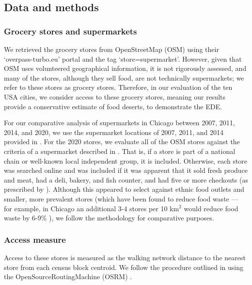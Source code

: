 \documentclass[final,3p,times,onecolumn,sort&compress]{elsarticle}
\begin{document}
\subsection{Data and methods}
\subsubsection{Grocery stores and supermarkets}
We retrieved the grocery stores from OpenStreetMap (OSM) using their `overpass-turbo.eu' portal and the tag `store=supermarket'.
However, given that OSM uses volunteered geographical information, it is not rigorously assessed, and many of the stores, although they sell food, are not technically supermarkets; we refer to these stores as grocery stores.
Therefore, in our evaluation of the ten USA cities, we consider access to these grocery stores, meaning our results provide a conservative estimate of food deserts, to demonstrate the EDE.

For our comparative analysis of supermarkets in Chicago between 2007, 2011, 2014, and 2020, we use the supermarket locations of 2007, 2011, and 2014 provided in \cite{Kolak2018-data}.
For the 2020 stores, we evaluate all of the OSM stores against the criteria of a supermarket described in \cite{Kolak2018-az}.
That is, if a store is part of a national chain or well-known local independent group, it is included.
Otherwise, each store was searched online and was included if it was apparent that it sold fresh produce and meat, had a deli, bakery, and fish counter, and had five or more checkouts (as prescribed by \cite{Block2006-dd}).
Although this appeared to select against ethnic food outlets and smaller, more prevalent stores (which have been found to reduce food waste --- for example, in Chicago an additional 3-4 stores per 10 km$^2$ would reduce food waste by 6-9\% \citep{Belavina2020-ui}), we follow the methodology for comparative purposes.

\subsubsection{Access measure}
Access to these stores is measured as the walking network distance to the nearest store from each census block centroid.
We follow the procedure outlined in \cite{Logan2019-fr} using the OpenSourceRoutingMachine (OSRM) \citep{luxen-vetter-2011}.
\end{document}
